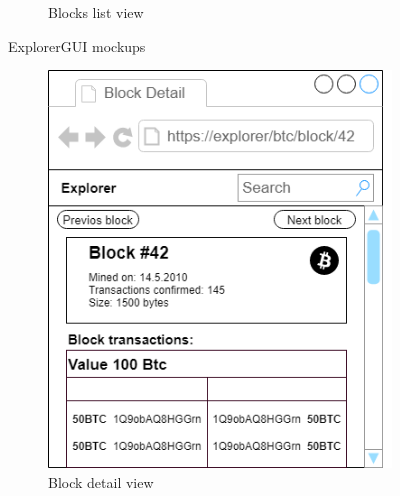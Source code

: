 \begin{figure}[h]
\begin{subfigure}[b]{.4\textwidth}
        \caption{Blocks list view}
        \label{blocksMockup}
    \end{subfigure}
    \caption{ExplorerGUI mockups}
\end{figure}

\begin{figure}[h]
    \centering
    \begin{subfigure}[b]{.4\textwidth}
        \centering
        \includegraphics[width=1.0\linewidth]{mockups/blockDetail.png}
        \caption{Block detail view}
        \label{blockDetailMockup}
    \end{subfigure}
    \begin{subfigure}[b]{.4\textwidth}
        \centering

\end{subfigure}
\end{figure}
